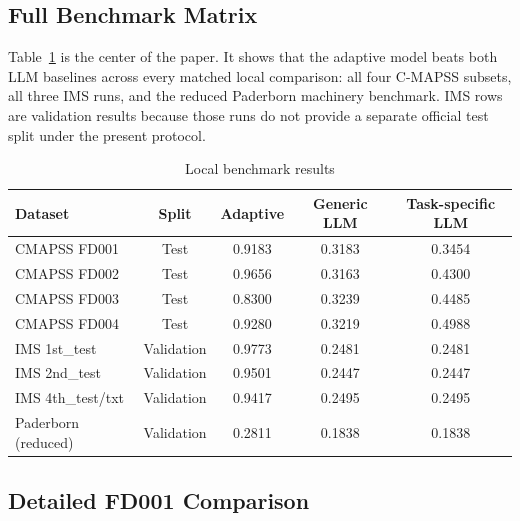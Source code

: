 \subsection{Full Benchmark Matrix}
Table~\ref{tab:all-datasets} is the center of the paper. It shows that the adaptive model beats both LLM baselines across every matched local comparison: all four C-MAPSS subsets, all three IMS runs, and the reduced Paderborn machinery benchmark. IMS rows are validation results because those runs do not provide a separate official test split under the present protocol.

\begin{table}[t]
\centering
\small
\caption{Local benchmark results}
\label{tab:all-datasets}
\begin{tabular}{@{}lcccc@{}}
\toprule
Dataset & Split & Adaptive & Generic LLM & Task-specific LLM \\
\midrule
CMAPSS FD001 & Test & 0.9183 & 0.3183 & 0.3454 \\
CMAPSS FD002 & Test & 0.9656 & 0.3163 & 0.4300 \\
CMAPSS FD003 & Test & 0.8300 & 0.3239 & 0.4485 \\
CMAPSS FD004 & Test & 0.9280 & 0.3219 & 0.4988 \\
IMS 1st\_test & Validation & 0.9773 & 0.2481 & 0.2481 \\
IMS 2nd\_test & Validation & 0.9501 & 0.2447 & 0.2447 \\
IMS 4th\_test/txt & Validation & 0.9417 & 0.2495 & 0.2495 \\
Paderborn (reduced) & Validation & 0.2811 & 0.1838 & 0.1838 \\
\bottomrule
\end{tabular}
\end{table}

\subsection{Detailed FD001 Comparison}
\begin{table}[t]
\centering
\small
\caption{C-MAPSS FD001 test-set results}
\label{tab:results-main}
\end{table}

